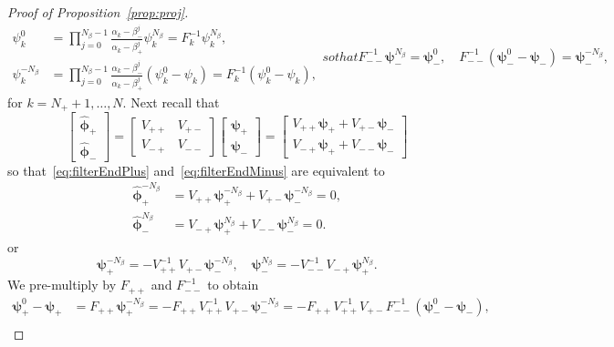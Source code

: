 \begin{proof}[Proof of Proposition~\ref{prop:proj}]
\begin{subequations}
\begin{align}
        \psi_k^0         &=\prod_{j=0}^{N_\beta-1}\frac{\alpha_k - \beta_-^j}{\alpha_k- \beta_+^{j}}\psi_k^{ N_\beta}   = F_k^{-1}\psi_k^{ N_\beta}  ,\label{eq:owns-p-filter-upstream}\\
        \psi_k^{-N_\beta}&=\prod_{j=0}^{N_\beta-1}\frac{\alpha_k - \beta_-^j}{\alpha_k- \beta_+^{j}}(\psi_k^{0}-\psi_k) = F_k^{-1}(\psi_k^{0}-\psi_k),
    \end{align}
    so that
    \begin{equation}
    F_{--}^{-1}\bm{\psi}_-^{ N_\beta}      = \bm{\psi}_-^{0},\quad
    F_{--}^{-1}(\bm{\psi}_-^0-\bm{\psi}_-) = \bm{\psi}_-^{-N_\beta},
    \end{equation}
    \end{subequations}
    for $k=N_++1,\dots,N$. Next recall that
    \[
    \begin{bmatrix}
        \hat{\bm{\phi}}_+\\
        \hat{\bm{\phi}}_-
    \end{bmatrix}
    =
    \begin{bmatrix}
        V_{++} & V_{+-}\\
        V_{-+} & V_{--}
    \end{bmatrix}
    \begin{bmatrix}
        \bm{\psi}_+\\
        \bm{\psi}_-
    \end{bmatrix}
    =
    \begin{bmatrix}
        V_{++}\bm{\psi}_{+}+V_{+-}\bm{\psi}_{-}\\
        V_{-+}\bm{\psi}_{+}+V_{--}\bm{\psi}_{-}
    \end{bmatrix}
    \]
    so that~\eqref{eq:filterEndPlus} and~\eqref{eq:filterEndMinus} are equivalent to
    \begin{align*}
        \hat{\bm{\phi}}_+^{-N_\beta}&=V_{++}\bm{\psi}_{+}^{-N_\beta}+V_{+-}\bm{\psi}_{-}^{-N_\beta}=0,\\
        \hat{\bm{\phi}}_-^{ N_\beta}&=V_{-+}\bm{\psi}_{+}^{ N_\beta}+V_{--}\bm{\psi}_{-}^{ N_\beta}=0.
    \end{align*}
    or
    \[
    \bm{\psi}_+^{-N_\beta}=-V_{++}^{-1}V_{+-}\bm{\psi}_-^{-N_\beta},\quad
    \bm{\psi}_-^{ N_\beta}=-V_{--}^{-1}V_{-+}\bm{\psi}_+^{ N_\beta}.
    \]
    We pre-multiply by $F_{++}$ and $F_{--}^{-1}$ to obtain
    \begin{align*}
        \bm{\psi}_+^0-\bm{\psi}_+
        &=F_{++}\bm{\psi}_+^{-N_\beta}
        =-F_{++}V_{++}^{-1}V_{+-}\bm{\psi}_-^{-N_\beta}
        =-F_{++}V_{++}^{-1}V_{+-}F_{--}^{-1}(\bm{\psi}_-^{0}-\bm{\psi}_-),\\

\end{align*}
\end{proof}
